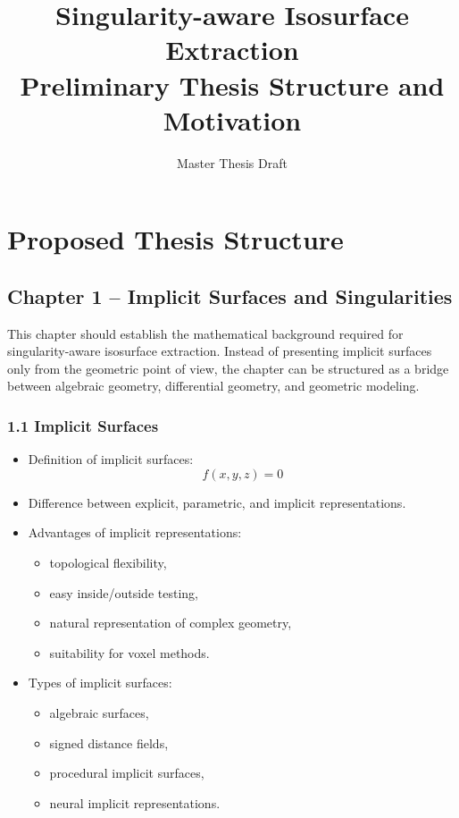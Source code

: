 \documentclass[12pt,a4paper]{article}
\title{Singularity-aware Isosurface Extraction\\
Preliminary Thesis Structure and Motivation}
\author{Master Thesis Draft}
\date{}
\begin{document}
\maketitle

\section*{Proposed Thesis Structure}

\subsection*{Chapter 1 -- Implicit Surfaces and Singularities}

This chapter should establish the mathematical background required for singularity-aware isosurface extraction. 
Instead of presenting implicit surfaces only from the geometric point of view, the chapter can be structured as a bridge between algebraic geometry, differential geometry, and geometric modeling.

\subsubsection*{1.1 Implicit Surfaces}
\begin{itemize}
    \item Definition of implicit surfaces:
    \[
    f(x,y,z)=0
    \]
    \item Difference between explicit, parametric, and implicit representations.
    \item Advantages of implicit representations:
    \begin{itemize}
        \item topological flexibility,
        \item easy inside/outside testing,
        \item natural representation of complex geometry,
        \item suitability for voxel methods.
    \end{itemize}
    \item Types of implicit surfaces:
    \begin{itemize}
        \item algebraic surfaces,
        \item signed distance fields,
        \item procedural implicit surfaces,
        \item neural implicit representations.
    \end{itemize}
\end{itemize}
\end{document}
